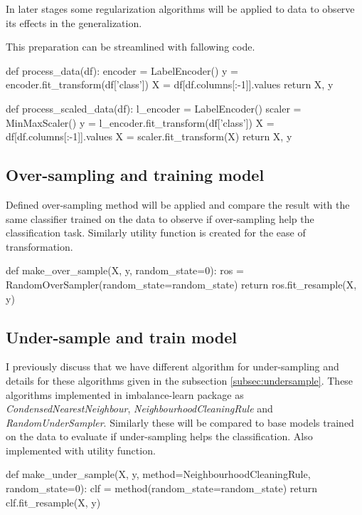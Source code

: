 \documentclass[12pt]{article}
\begin{document}
In later stages some regularization algorithms will be applied to data to observe its effects in the generalization.

This preparation can be streamlined with fallowing code.

\begin{python}
    def process_data(df):
        encoder = LabelEncoder()
        y = encoder.fit_transform(df['class'])
        X = df[df.columns[:-1]].values
        return X, y

    def process_scaled_data(df):
        l_encoder = LabelEncoder()
        scaler = MinMaxScaler()
        y = l_encoder.fit_transform(df['class'])
        X = df[df.columns[:-1]].values
        X = scaler.fit_transform(X)
        return X, y
\end{python}

\subsection{Over-sampling and training model} \label{subsec:oversample}
Defined over-sampling method will be applied and compare the result with the same classifier trained on the data to observe if over-sampling help the classification task. Similarly utility function is created for the ease of transformation.

\begin{python}
    def make_over_sample(X, y, random_state=0):
        ros = RandomOverSampler(random_state=random_state)
        return ros.fit_resample(X, y)
\end{python}

\subsection{Under-sample and train model} \label{subsec:compareundersample}

I previously discuss that we have different algorithm for under-sampling and details for these algorithms given in the subsection \ref{subsec:undersample}. These algorithms implemented in imbalance-learn package as \textit{CondensedNearestNeighbour}, \textit{NeighbourhoodCleaningRule} and \textit{RandomUnderSampler}. Similarly these will be compared to base models trained on the data to evaluate if under-sampling helps the classification. Also implemented with utility function.

\begin{python}
    def make_under_sample(X, y, method=NeighbourhoodCleaningRule, random_state=0):
        clf = method(random_state=random_state)
        return clf.fit_resample(X, y)
\end{python}
\end{document}
